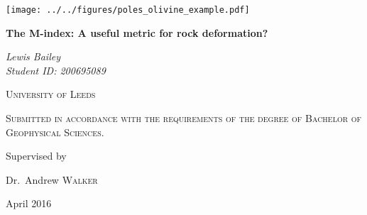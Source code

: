 \documentclass[12pt,a4paper]{report}
\begin{document}
\begin{titlepage}
	\centering
	\texttt{[image: ../../figures/poles\_olivine\_example.pdf]}\par\vspace{1cm}
    \huge{\textbf{The M-index: A useful metric for rock deformation?}}\par
    \vspace{1cm}
    {\Large \textit{Lewis Bailey\\Student ID: 200695089}\par}

	\vspace{1.5cm}


    {\scshape\LARGE University of Leeds \par}
	\vspace{2cm}
	{\scshape\Large Submitted in accordance with the requirements of the degree of Bachelor of Geophysical Sciences.\par}
	\vspace{2cm}
	Supervised by\par
	Dr.~Andrew \textsc{Walker}

	\vfill

	{\large April 2016\par}
	
	\newpage\pagestyle{plain}\mbox{}\newpage
	

\end{titlepage}
\end{document}

